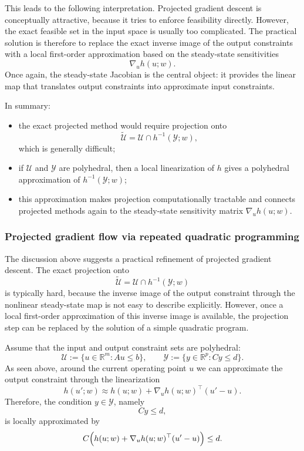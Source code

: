 This leads to the following interpretation. Projected gradient descent is conceptually attractive, because it tries to enforce feasibility directly. However, the exact feasible set in the input space is usually too complicated. The practical solution is therefore to replace the exact inverse image of the output constraints with a local first-order approximation based on the steady-state sensitivities
\[
\nabla_u h(u;w).
\]
Once again, the steady-state Jacobian is the central object: it provides the linear map that translates output constraints into approximate input constraints.

In summary:
\begin{itemize}
    \item the exact projected method would require projection onto
    \[
    \tilde{\mathcal U}=\mathcal U\cap h^{-1}(\mathcal Y;w),
    \]
    which is generally difficult;
    \item if $\mathcal U$ and $\mathcal Y$ are polyhedral, then a local linearization of $h$ gives a polyhedral approximation of $h^{-1}(\mathcal Y;w)$;
    \item this approximation makes projection computationally tractable and connects projected methods again to the steady-state sensitivity matrix $\nabla_u h(u;w)$.
\end{itemize}

\subsubsection{Projected gradient flow via repeated quadratic programming}

The discussion above suggests a practical refinement of projected gradient descent. The exact projection onto
\[
\tilde{\mathcal U}=\mathcal U\cap h^{-1}(\mathcal Y;w)
\]
is typically hard, because the inverse image of the output constraint through the nonlinear steady-state map is not easy to describe explicitly. However, once a local first-order approximation of this inverse image is available, the projection step can be replaced by the solution of a simple quadratic program.

Assume that the input and output constraint sets are polyhedral:
\[
\mathcal U:=\{u\in\mathbb R^m:Au\le b\},
\qquad
\mathcal Y:=\{y\in\mathbb R^p:Cy\le d\}.
\]
As seen above, around the current operating point $u$ we can approximate the output constraint through the linearization
\[
h(u';w)\approx h(u;w)+\nabla_u h(u;w)^\top (u'-u).
\]
Therefore, the condition $y\in\mathcal Y$, namely
\[
Cy\le d,
\]
is locally approximated by
\[
C\Bigl(h(u;w)+\nabla_u h(u;w)^\top (u'-u)\Bigr)\le d.
\]

